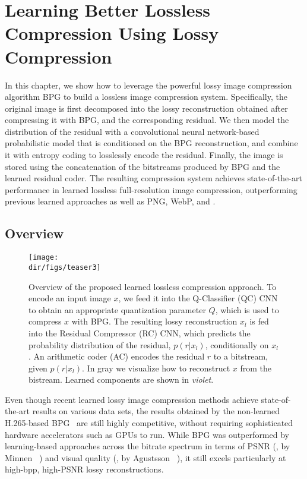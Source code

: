 \chapter{Learning Better Lossless Compression Using Lossy Compression} \label{ch:rc}

In this chapter, we show how to leverage the powerful lossy image compression
algorithm BPG to build a lossless image compression system. Specifically, the
original image is first decomposed into the lossy reconstruction obtained after
compressing it with BPG, and the corresponding residual.  We then model the
distribution of the residual with a convolutional neural network-based
probabilistic model that is conditioned on the BPG reconstruction, and combine
it with entropy coding to losslessly encode the residual. Finally, the image is
stored using the concatenation of the bitstreams produced by BPG and the
learned residual coder.  The resulting compression system achieves
state-of-the-art performance in learned lossless full-resolution image
compression, outperforming previous learned approaches as well as PNG, WebP,
and \jpegk.


\section{Overview}


\begin{figure}[t!]
\centering
\texttt{[image: \\dir/figs/teaser3]}
    \caption{\label{rc:fig:model}Overview of the proposed learned lossless compression approach. To encode an input image $x$, we feed it into the Q-Classifier (QC) CNN to obtain an appropriate quantization parameter $Q$, which is used to compress $x$ with BPG. The resulting lossy reconstruction $x_l$ is fed into the Residual Compressor (RC) CNN, which predicts the probability distribution of the residual, $p(r|x_l)$, conditionally on $x_l$. An arithmetic coder (AC) encodes the residual $r$ to a bitstream, given $p(r|x_l)$. In gray we visualize how to reconstruct $x$ from the bistream. Learned components are shown in \emph{\textcolor{figureviolet}{violet}}.}
\end{figure}

Even though recent learned lossy image compression methods achieve state-of-the-art results on various data sets, the results obtained by the non-learned H.265-based BPG~\cite{sullivan2012overview,bpg} are still highly competitive,
without requiring sophisticated hardware accelerators such as GPUs to run.
While BPG was outperformed by learning-based approaches across the bitrate spectrum in terms of PSNR (\eg, by Minnen \etal~\cite{minnen2018joint}) and visual quality (\eg, by Agustsson \etal~\cite{agustsson2019extreme}), it still excels particularly at high-bpp, high-PSNR lossy reconstructions.

